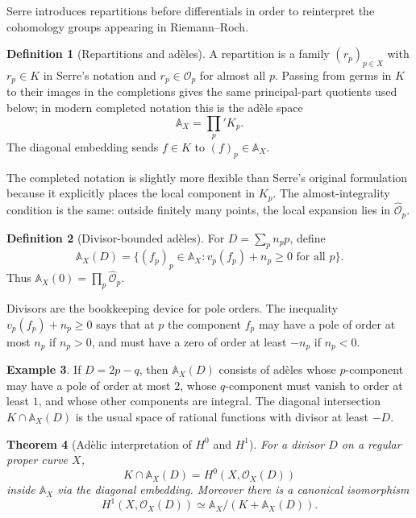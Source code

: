 \documentclass[11pt,a4paper]{article}
\newcommand{\OO}{\mathcal O}
\newcommand{\wideO}{\widehat{\mathcal O}}
\newcommand{\AX}{\mathbb A_X}
\theoremstyle{definition}
\newtheorem{definition}{Definition}[section]
\newtheorem{example}[definition]{Example}
\theoremstyle{plain}
\newtheorem{theorem}[definition]{Theorem}
\theoremstyle{remark}
\begin{document}
Serre introduces repartitions before differentials in order to reinterpret the cohomology groups appearing in Riemann--Roch.

\begin{definition}[Repartitions and adèles]
A repartition is a family $(r_p)_{p\in X}$ with $r_p\in K$ in Serre's notation and $r_p\in\OO_p$ for almost all $p$.  Passing from germs in $K$ to their images in the completions gives the same principal-part quotients used below; in modern completed notation this is the adèle space
\[
  \AX=\prod_p'K_p.
\]
The diagonal embedding sends $f\in K$ to $(f)_p\in\AX$.
\end{definition}

The completed notation is slightly more flexible than Serre's original formulation because it explicitly places the local component in $K_p$.  The almost-integrality condition is the same: outside finitely many points, the local expansion lies in $\wideO_p$.

\begin{definition}[Divisor-bounded adèles]
For $D=\sum_p n_p p$, define
\[
  \AX(D)=\{(f_p)_p\in\AX : v_p(f_p)+n_p\ge0\text{ for all }p\}.
\]
Thus $\AX(0)=\prod_p\wideO_p$.
\end{definition}

Divisors are the bookkeeping device for pole orders.  The inequality $v_p(f_p)+n_p\ge0$ says that at $p$ the component $f_p$ may have a pole of order at most $n_p$ if $n_p>0$, and must have a zero of order at least $-n_p$ if $n_p<0$.

\begin{example}
If $D=2p-q$, then $\AX(D)$ consists of adèles whose $p$-component may have a pole of order at most $2$, whose $q$-component must vanish to order at least $1$, and whose other components are integral.  The diagonal intersection $K\cap\AX(D)$ is the usual space of rational functions with divisor at least $-D$.
\end{example}

\begin{theorem}[Adèlic interpretation of $H^0$ and $H^1$]
For a divisor $D$ on a regular proper curve $X$,
\[
  K\cap \AX(D)=H^0(X,\OO_X(D))
\]
inside $\AX$ via the diagonal embedding.  Moreover there is a canonical isomorphism
\[
  H^1(X,\OO_X(D))\simeq \AX/(K+\AX(D)).
\]
\end{theorem}
\end{document}
